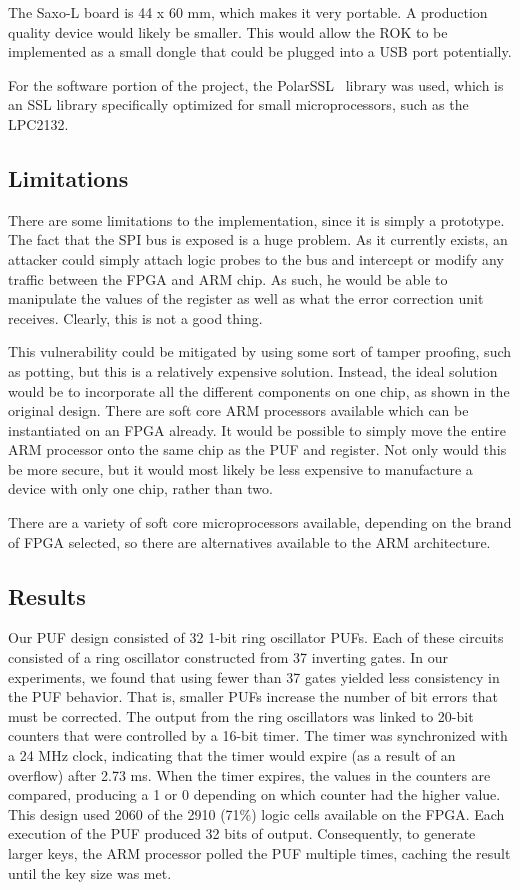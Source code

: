 The Saxo-L board is 44 x 60 mm, which makes it very portable. A production quality device would likely be smaller.
This would allow the ROK to be implemented as a small dongle that could be plugged into a USB port potentially.

For the software portion of the project, the PolarSSL~\cite{polarssl} library was used, which is an SSL library
specifically optimized for small microprocessors, such as the LPC2132.

\subsection{Limitations}
There are some limitations to the implementation, since it is simply a prototype. The fact that the SPI bus is exposed
is a huge problem. As it currently exists, an attacker could simply attach logic probes to the bus and intercept or
modify any traffic between the FPGA and ARM chip. As such, he would be able to manipulate the values of the register
as well as what the error correction unit receives. Clearly, this is not a good thing.

This vulnerability could be mitigated by using some sort of tamper proofing, such as potting, but this is a relatively
expensive solution. Instead, the ideal solution would be to incorporate all the different components on one chip, as
shown in the original design. There are soft core ARM processors available which can be instantiated on an FPGA
already. It would be possible to simply move the entire ARM processor onto the same chip as the PUF and register.
Not only would this be more secure, but it would most likely be less expensive to manufacture a device with only
one chip, rather than two.

There are a variety of soft core microprocessors available, depending on the brand of FPGA selected, so there are
alternatives available to the ARM architecture.

\subsection{Results}
Our PUF design consisted of 32 1-bit ring oscillator PUFs.
Each of these circuits consisted of a ring oscillator constructed from 37 inverting gates.
In our experiments, we found that using fewer than 37 gates yielded less consistency in the
PUF behavior.  That is, smaller PUFs increase the number of bit errors that must be corrected.
The output from the ring oscillators was linked to 20-bit
counters that were controlled by a 16-bit timer.  The timer was synchronized with a 24 MHz
clock, indicating that the timer would expire (as a result of an overflow) after 2.73 ms.
When the timer expires, the values in the counters are compared, producing a 1 or 0 depending
on which counter had the higher value.
This design used 2060 of the 2910 (71\%) logic cells available on the FPGA.  Each execution
of the PUF produced 32 bits of output.  Consequently, to generate larger keys, the ARM processor
polled the PUF multiple times, caching the result until the key size was met.

